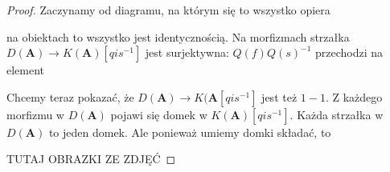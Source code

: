 \begin{proof}
  Zaczynamy od diagramu, na którym się to wszystko opiera 
  \begin{center}\end{center}
  na obiektach to wszystko jest identycznością. Na morfizmach strzałka $D(\mathbf{A})\to K(\mathbf{A})[qis^{-1}]$ jest surjektywna: $Q(f)Q(s)^{-1}$ przechodzi na element
  \begin{center}\end{center} 
  Chcemy teraz pokazać, że $D(\mathbf{A})\to K(\mathbf{A}[qis^{-1}]$ jest też $1-1$. Z każdego morfizmu w $D(\mathbf{A})$ pojawi się domek w $K(\mathbf{A})[qis^{-1}]$. Każda strzałka w $D(\mathbf{A})$ to jeden domek. Ale ponieważ umiemy domki składać, to 
  \begin{center}\end{center}
  {\large\color{red}TUTAJ OBRAZKI ZE ZDJĘĆ}


\end{proof}
